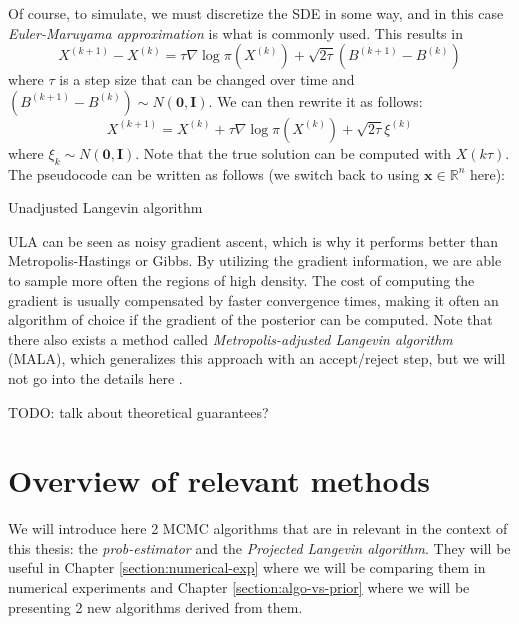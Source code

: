 \documentclass[12pt]{memoir}
\newcommand{\mb}{\mathbf}
\newcommand{\ti}{\textit}
\begin{document}
Of course, to simulate, we must discretize the SDE in some way, and in this case \textit{Euler-Maruyama approximation} is what is commonly used. This results in
\begin{equation}
    X^{(k+1)} - X^{(k)} = \tau \nabla \log\pi(X^{(k)}) + \sqrt{2\tau}(B^{(k+1)} - B^{(k)})
\end{equation}
where $\tau$ is a step size that can be changed over time and $(B^{(k+1)} - B^{(k)}) \sim N(\mb 0, \mb I)$. We can then rewrite it as follows:
\begin{equation}
    X^{(k+1)} = X^{(k)} + \tau \nabla \log\pi(X^{(k)}) + \sqrt{2\tau}\xi^{(k)}
\end{equation}
where $\xi_k \sim N(\mb 0, \mb I)$. Note that the true solution can be computed with $X(k\tau)$. The pseudocode can be written as follows (we switch back to using $\mb x \in \mathbb{R}^n$ here):\medbreak
\begin{algorithm}[H]
    \DontPrintSemicolon

    \Input{$\mb x^{(0)}, K, B, \tau_{1:K}$}
    \Output{$\mb x^{(B+1)}, \mb x^{(B+2)}, \dots, \mb x^{(K)}$}
    \For{$k\gets 1:K$}{ 
        $\boldsymbol{\xi}^{(k)} \sim N(\mb 0, \mb I)$\;
        $\mb x^{(k+1)} = \mb x^{(k)} + \tau_k \nabla \log\pi(\mb x^{(k)}) + \sqrt{2\tau_k}\boldsymbol{\xi}^{(k)}$\;
    }
    \caption{Unadjusted Langevin algorithm}
\end{algorithm}\medbreak

ULA can be seen as noisy gradient ascent, which is why it performs better than Metropolis-Hastings or Gibbs. By utilizing the gradient information, we are able to sample more often the regions of high density. The cost of computing the gradient is usually compensated by faster convergence times, making it often an algorithm of choice if the gradient of the posterior can be computed. Note that there also exists a method called \textit{Metropolis-adjusted Langevin algorithm} (MALA), which generalizes this approach with an accept/reject step, but we will not go into the details here \cite{mcmc:langenvin-blog:Ansari2024Apr, wiki:MALA}.

TODO: talk about theoretical guarantees?

\chapter{Overview of relevant methods} \label{section:relevant-methods}
We will introduce here 2 MCMC algorithms that are in relevant in the context of this thesis: the \ti{prob-estimator} and the \ti{Projected Langevin algorithm}. They will be useful in Chapter \ref{section:numerical-exp} where we will be comparing them in numerical experiments and Chapter \ref{section:algo-vs-prior} where we will be presenting 2 new algorithms derived from them.
\end{document}

